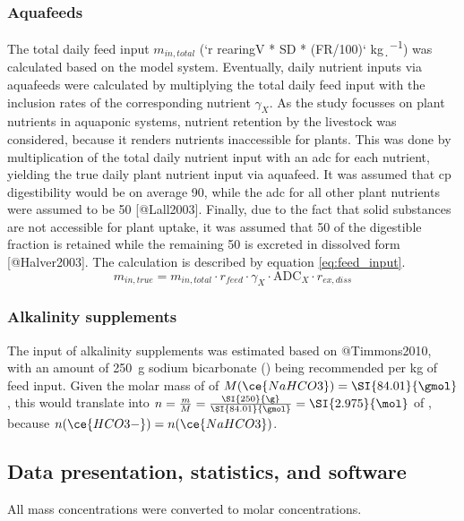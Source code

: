 {\subsubsection{Aquafeeds}
The total daily feed input $m_{in,total}$ (`r rearingV * SD * (FR/100)` \si{\kg\per\d}) was calculated based on the model system. Eventually, daily nutrient inputs via aquafeeds were calculated by multiplying the total daily feed input with the inclusion rates of the corresponding nutrient $\gamma_{X}$. As the study focusses on plant nutrients in aquaponic systems, nutrient retention by the livestock was considered, because it renders nutrients inaccessible for plants. This was done by multiplication of the total daily nutrient input with an \gls{adc} for each nutrient, yielding the true daily plant nutrient input via aquafeed. It was assumed that \gls{cp} digestibility would be on average \SI{90}{\p}, while the \gls{adc} for all other plant nutrients were assumed to be \SI{50}{\p} [@Lall2003]. Finally, due to the fact that solid substances are not accessible for plant uptake, it was assumed that \SI{50}{\p} of the digestible fraction is retained while the remaining \SI{50}{\p} is excreted in dissolved form [@Halver2003]. The calculation is described by equation \ref{eq:feed_input}.
\begin{equation}
  m_{in,true} = m_{in,total} \cdot r_{feed} \cdot \gamma_{X} \cdot \text{ADC}_{X} \cdot r_{ex,diss}
  \label{eq:feed_input}
\end{equation}



\subsubsection{Alkalinity supplements}
The input of alkalinity supplements was estimated based on @Timmons2010, with an amount of \SI{250}{\g} sodium bicarbonate () being recommended per \si{\kg} of feed input. Given the molar mass of  of $M(\ce{NaHCO3}) = \SI{84.01}{\gmol}$, this would translate into $n = \frac{m}{M} = \frac{\SI{250}{\g}}{\SI{84.01}{\gmol}} = \SI{2.975}{\mol}$ of , because $n(\ce{HCO3-}) = n(\ce{NaHCO3})$.  




\subsection{Data presentation, statistics, and software}
All mass concentrations were converted to molar concentrations.

}
